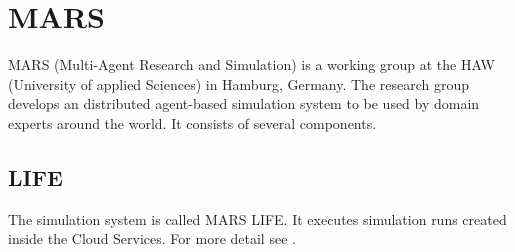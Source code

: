 \section{MARS}
MARS (Multi-Agent Research and Simulation) is a working group at the HAW (University of applied Sciences) in Hamburg, Germany. The research group develops an distributed agent-based simulation system to be used by domain experts around the world. It consists of several components.


\subsection{LIFE}
The simulation system is called MARS LIFE. It executes simulation runs created inside the Cloud Services. For more detail see \cite{Huning2016}.


%
%


%
%
%
